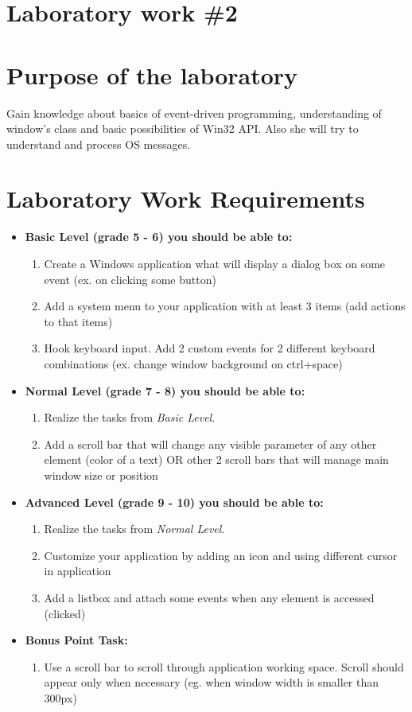\section*{Laboratory work \#2}

\section{Purpose of the laboratory}
Gain knowledge about basics of event-driven programming, understanding of window’s class and basic possibilities of Win32 API. Also she will try to understand and process OS messages.
\section{Laboratory Work Requirements}
\begin{itemize}
\item \textbf{Basic Level (grade 5 - 6) you should be able to:}
	\begin{enumerate}
	\item Create a Windows application what will display a dialog box on some event (ex. on clicking some button)
    \item Add a system menu to your application with at least 3 items (add actions to that items)
    \item Hook keyboard input. Add 2 custom events for 2 different keyboard combinations (ex. change window background on ctrl+space)
    \end{enumerate}
\item \textbf{Normal Level (grade 7 - 8) you should be able to:}
    \begin{enumerate}
    \item Realize the tasks from \textit{Basic Level}.
    \item Add a scroll bar that will change any visible parameter of any other element (color of a text) OR other 2 scroll bars that will manage main window size or position
    \end{enumerate}
\item \textbf{Advanced Level (grade 9 - 10) you should be able to:}
    \begin{enumerate}
    \item Realize the tasks from \textit{Normal Level}.
    \item Customize your application by adding an icon and using different cursor in application
    \item Add a listbox and attach some events when any element is accessed (clicked) 
    \end{enumerate}
\item \textbf{Bonus Point Task:} 
    \begin{enumerate}
    \item Use a scroll bar to scroll through application working space. Scroll should appear only when necessary (eg. when window width is smaller than 300px)
    \end{enumerate}
  \end{itemize}  

\clearpage